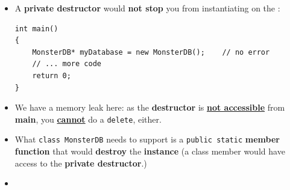 \documentclass[10pt]{article}
\newcommand{\pbreak}{\vspace{30pt}}
\newcommand{\vocab}[1]{\fbox{\textbf{\textit{#1}}}}
\begin{document}
\begin{itemize}
		\pbreak

	\item A \textbf{private destructor} would \textbf{not stop} you from instantiating on the \vocab{heap}:

		\begin{verbatim}
int main()
{
	MonsterDB* myDatabase = new MonsterDB();	// no error
	// ... more code
	return 0;
}
		\end{verbatim}

	\item We have a memory leak here: as the \textbf{destructor} is \underline{\textbf{not accessible}} from \textbf{main}, you \underline{\textbf{cannot}} do a \verb|delete|, either.

	\item What \verb|class MonsterDB| needs to support is a \verb|public static| \textbf{member function} that would \textbf{destroy} the \textbf{instance} (a class member would have access to the \textbf{private destructor}.)

	\item {}
\end{itemize}

\newpage
\end{document}
